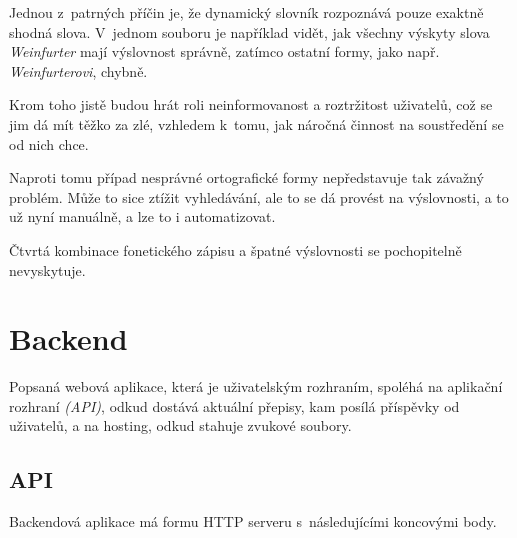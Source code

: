 Jednou z~patrných příčin je, že dynamický slovník rozpoznává pouze exaktně
shodná slova. V~jednom souboru je například vidět, jak všechny výskyty slova
{\em Weinfurter} mají výslovnost správně, zatímco ostatní formy, jako např. {\em
Weinfurterovi}, chybně.

Krom toho jistě budou hrát roli neinformovanost a roztržitost uživatelů, což se
jim dá mít těžko za zlé, vzhledem k~tomu, jak náročná činnost na soustředění se
od nich chce.

Naproti tomu případ nesprávné ortografické formy nepředstavuje tak závažný
problém. Může to sice ztížit vyhledávání, ale to se dá provést na výslovnosti, a
to už nyní manuálně, a lze to i automatizovat.

Čtvrtá kombinace fonetického zápisu a špatné výslovnosti se pochopitelně
nevyskytuje.

\normalfont 

\section{Backend}

Popsaná webová aplikace, která je uživatelským rozhraním, spoléhá na aplikační
rozhraní {\em (API)}, odkud dostává aktuální přepisy, kam posílá příspěvky od
uživatelů, a na hosting, odkud stahuje zvukové soubory.

\subsection{API}

Backendová aplikace má formu HTTP serveru s~následujícími koncovými body.

